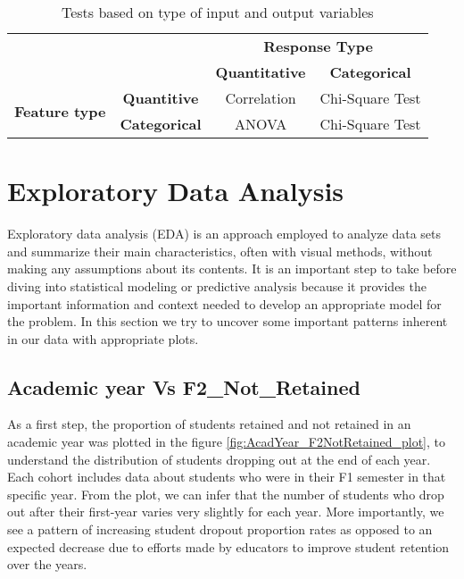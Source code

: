 \documentclass[11pt,openright]{report}
\begin{document}
\begin{table}[!t]
	\renewcommand{\arraystretch}{1.3}
	\caption{Tests based on type of input and output variables}
	\label{table:statistical_db}
	\centering
	\begin{tabular}{|c|c|c|c|}
    \hline
    \multicolumn{2}{|c|}{} & \multicolumn{2}{|c|}{ \bfseries Response Type}\\ \cline{3-4}
      \multicolumn{2}{|c|}{} & \bfseries Quantitative & \bfseries Categorical\\ \hline
     \multirow{2}{*}{ \bfseries Feature type}   &  \bfseries Quantitive & Correlation & Chi-Square Test \\ \cline{2-4}
     & \bfseries Categorical & ANOVA & Chi-Square Test\\
    \hline

\end{tabular}
\end{table}








\section{Exploratory Data Analysis}
Exploratory data analysis (EDA) is an approach employed to analyze data sets and summarize their main characteristics, often with visual methods, without making any assumptions about its contents. It is an important step to take before diving into statistical modeling or predictive analysis because it provides the important information and context needed to develop an appropriate model for the problem. In this section we try to uncover some important patterns inherent in our data with appropriate plots.

\subsection {Academic year Vs F2\_Not\_Retained}
As a first step, the proportion of students retained and not retained in an academic year was plotted in the figure \ref{fig:AcadYear_F2NotRetained_plot}, to understand the distribution of students dropping out at the end of each year. Each cohort includes data about students who were in their F1 semester in that specific year. From the plot, we can infer that the number of students who drop out after their first-year varies very slightly for each year. More importantly, we see a pattern of increasing student dropout proportion rates as opposed to an expected decrease due to efforts made by educators to improve student retention over the years.
\end{document}
